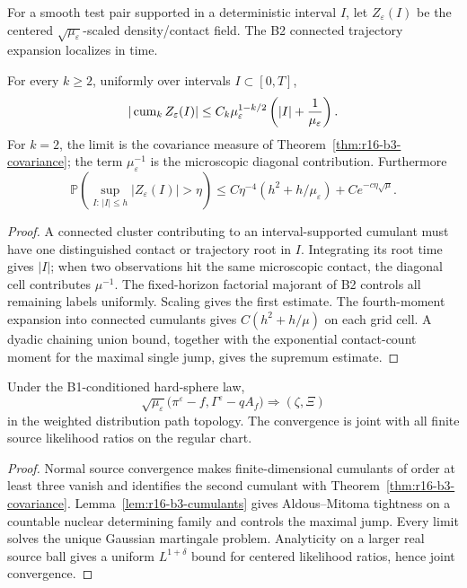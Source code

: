 For a smooth test pair supported in a deterministic interval \(I\), let
\(Z_\varepsilon(I)\) be the centered
\(\sqrt{\mu_\varepsilon}\)-scaled density/contact field.  The B2 connected
trajectory expansion localizes in time.

\begin{lemma}
\label{lem:r16-b3-cumulants}
For every \(k\ge2\), uniformly over intervals \(I\subset[0,T]\),
\[
 |\operatorname{cum}_k Z_\varepsilon(I)|
 \le C_k\mu_\varepsilon^{1-k/2}
 \left(|I|+{1\over\mu_\varepsilon}\right).
\]
For \(k=2\), the limit is the covariance measure of
Theorem~\ref{thm:r16-b3-covariance}; the term
\(\mu_\varepsilon^{-1}\) is the microscopic diagonal contribution.
Furthermore
\[
 \mathbb P\left(
 \sup_{I:\,|I|\le h}|Z_\varepsilon(I)|>\eta
 \right)
 \le C\eta^{-4}(h^2+h/\mu_\varepsilon)+Ce^{-c\eta\sqrt\mu}.
\]
\end{lemma}

\begin{proof}
A connected cluster contributing to an interval-supported cumulant must have
one distinguished contact or trajectory root in \(I\).  Integrating its root
time gives \(|I|\); when two observations hit the same microscopic contact,
the diagonal cell contributes \(\mu^{-1}\).  The fixed-horizon factorial
majorant of B2 controls all remaining labels uniformly.  Scaling gives the
first estimate.  The fourth-moment expansion into connected cumulants gives
\(C(h^2+h/\mu)\) on each grid cell.  A dyadic chaining union bound, together
with the exponential contact-count moment for the maximal single jump, gives
the supremum estimate.
\end{proof}

\begin{theorem}
\label{thm:r16-b3-clt}
Under the B1-conditioned hard-sphere law,
\[
 \sqrt{\mu_\varepsilon}
 \bigl(\pi^\varepsilon-f,\Gamma^\varepsilon-qA_f\bigr)
 \Longrightarrow(\zeta,\Xi)
\]
in the weighted distribution path topology.  The convergence is joint with
all finite source likelihood ratios on the regular chart.
\end{theorem}

\begin{proof}
Normal source convergence makes finite-dimensional cumulants of order at
least three vanish and identifies the second cumulant with
Theorem~\ref{thm:r16-b3-covariance}.  Lemma~\ref{lem:r16-b3-cumulants} gives
Aldous--Mitoma tightness on a countable nuclear determining family and controls
the maximal jump.  Every limit solves the unique Gaussian martingale problem.
Analyticity on a larger real source ball gives a uniform
\(L^{1+\delta}\) bound for centered likelihood ratios, hence joint
convergence.
\end{proof}

